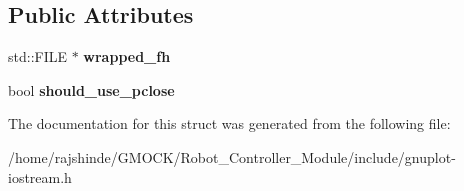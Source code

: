 \subsection*{Public Attributes}
\begin{DoxyCompactItemize}
\item 
std\+::\+F\+I\+LE $\ast$ {\bfseries wrapped\+\_\+fh}\hypertarget{structgnuplotio_1_1_file_handle_wrapper_adcb58bfcd9dbdba000a7e7395bee2ef9}{}\label{structgnuplotio_1_1_file_handle_wrapper_adcb58bfcd9dbdba000a7e7395bee2ef9}

\item 
bool {\bfseries should\+\_\+use\+\_\+pclose}\hypertarget{structgnuplotio_1_1_file_handle_wrapper_a11b63ed64cf53167e26c5273778d90ea}{}\label{structgnuplotio_1_1_file_handle_wrapper_a11b63ed64cf53167e26c5273778d90ea}

\end{DoxyCompactItemize}


The documentation for this struct was generated from the following file\+:\begin{DoxyCompactItemize}
\item 
/home/rajshinde/\+G\+M\+O\+C\+K/\+Robot\+\_\+\+Controller\+\_\+\+Module/include/gnuplot-\/iostream.\+h\end{DoxyCompactItemize}
